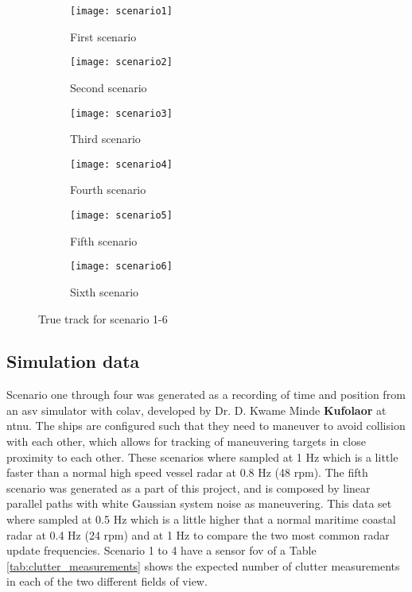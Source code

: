 \begin{figure}[H]
    \centering
    \begin{subfigure}{0.4\textwidth}
        \centering
        \texttt{[image: scenario1]}
        \caption{First scenario}
    \end{subfigure}
    \begin{subfigure}{0.4\textwidth}
        \centering
        \texttt{[image: scenario2]}
        \caption{Second scenario}
    \end{subfigure}
    \begin{subfigure}{0.4\textwidth}
        \centering
        \texttt{[image: scenario3]}
        \caption{Third scenario}
    \end{subfigure}
    \begin{subfigure}{0.4\textwidth}
        \centering
        \texttt{[image: scenario4]}
        \caption{Fourth scenario}
    \end{subfigure}
    \begin{subfigure}{0.4\textwidth}
        \centering
        \texttt{[image: scenario5]}
        \caption{Fifth scenario}
    \end{subfigure}
    \begin{subfigure}{0.4\textwidth}
        \centering
        \texttt{[image: scenario6]}
        \caption{Sixth scenario}
    \end{subfigure}
    \caption{True track for scenario 1-6}
    \label{fig:true_tracks}
\end{figure} 

\subsection{Simulation data}
Scenario one through four was generated as a recording of time and position from an \gls{asv} simulator with \gls{colav}, developed by Dr. D. Kwame Minde  \textbf{Kufolaor} at \gls{ntnu}. The ships are configured such that they need to maneuver to avoid collision with each other, which allows for tracking of maneuvering targets in close proximity to each other. These scenarios where sampled at 1 Hz which is a little faster than a normal high speed vessel \gls{radar} at 0.8 Hz (48 \gls{rpm}). The fifth scenario was generated as a part of this project, and is composed by linear parallel paths with white Gaussian system noise as maneuvering. This data set where sampled at 0.5 Hz which is a little higher that a normal maritime coastal \gls{radar} at 0.4 Hz (24 \gls{rpm}) and at 1 Hz to compare the two most common \gls{radar} update frequencies. Scenario 1 to 4 have a sensor \gls{fov} of a Table \ref{tab:clutter_measurements} shows the expected number of clutter measurements in each of the two different fields of view. 

